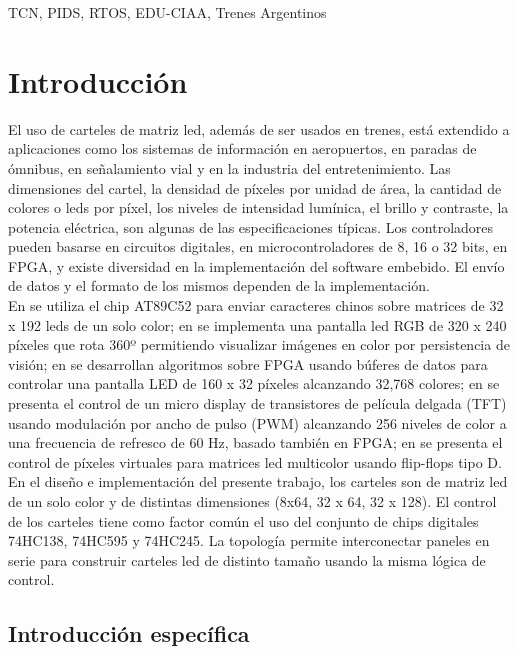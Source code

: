 \documentclass[conference]{IEEEtran}
\begin{document}
\begin{IEEEkeywords}
TCN, PIDS, RTOS, EDU-CIAA, Trenes Argentinos
\end{IEEEkeywords}

\section{Introducción}

El uso de carteles de matriz led, además de ser usados en trenes, está extendido a aplicaciones como los sistemas de información en aeropuertos, en paradas de ómnibus, en señalamiento vial y en la industria del entretenimiento. Las dimensiones del cartel, la densidad de píxeles por unidad de área, la cantidad de colores o leds por píxel, los niveles de intensidad lumínica, el brillo y contraste, la potencia eléctrica, son algunas de las especificaciones típicas. Los controladores pueden basarse en circuitos digitales, en microcontroladores de 8, 16 o 32 bits, en FPGA, y existe diversidad en la implementación del software embebido. El envío de datos y el formato de los mismos dependen de la implementación. \\

En \cite{b1} se utiliza el chip AT89C52 para enviar caracteres chinos sobre matrices de 32 x 192 leds de un solo color; en \cite{b2} se implementa una pantalla led RGB de 320 x 240 píxeles que rota 360º permitiendo visualizar imágenes en color por persistencia de visión; en \cite{b3} se desarrollan algoritmos sobre FPGA usando búferes de datos para controlar una pantalla LED de 160 x 32 píxeles alcanzando 32,768 colores; en \cite{b4} se presenta el control de un micro display de transistores de película delgada (TFT) usando modulación por ancho de pulso (PWM) alcanzando 256 niveles de color a una frecuencia de refresco de 60 Hz, basado también en FPGA; en \cite{b5} se presenta el control de píxeles virtuales para matrices led multicolor usando flip-flops tipo D. \\

En el diseño e implementación del presente trabajo, los carteles son de matriz led de un solo color y de distintas dimensiones (8x64, 32 x 64, 32 x 128). El control de los carteles tiene como factor común el uso del conjunto de chips digitales 74HC138, 74HC595 y 74HC245. La topología permite interconectar paneles en serie para construir carteles led de distinto tamaño usando la misma lógica de control. \\

\subsection{Introducción específica}
\end{document}
